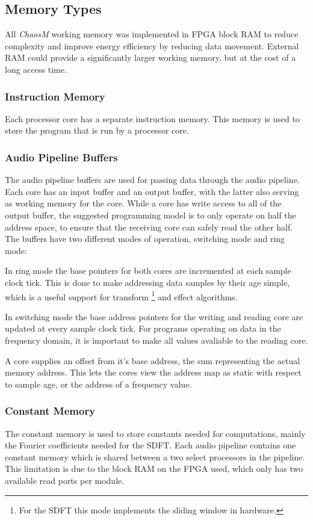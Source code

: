 
\subsection{Memory Types}\label{subsec:fpga-memory}

All \textit{ChaosM} working memory was implemented in FPGA block RAM to reduce complexity
and improve energy efficiency by reducing data movement. External RAM could
provide a significantly larger working memory, but at the cost of a long access time.

\subsubsection{Instruction Memory}
Each processor core has a separate instruction memory. This memory is used to
store the program that is run by a processor core.

\subsubsection{Audio Pipeline Buffers}
The audio pipeline buffers are used for passing data through the audio pipeline.
Each core has an input buffer and an output buffer, with the latter also serving
as working memory for the core. While a core has write access to all of the 
output buffer, the suggested programming model is to only operate on half the
address space, to ensure that the receiving core can safely read the other half.
The buffers have two different modes of operation, switching mode and ring mode:

In ring mode the base pointers for both cores are incremented at each sample
clock tick. This is done to make addressing data samples by their age simple,
which is a useful support for transform \footnote{For the SDFT this mode implements the sliding window in hardware.} and effect algorithms.

In switching mode the base address pointers for the writing and reading core are
updated at every sample clock tick. For programs operating on data in the
frequency domain, it is important to make all values avaliable to the reading core.

A core supplies an offset from it's base address, the sum representing the
actual memory address. This lets the cores view the address map as static with
respect to sample age, or the address of a frequency value.

\subsubsection{Constant Memory}
The constant memory is used to store constants needed for computations, mainly
the Fourier coefficients needed for the SDFT. Each audio pipeline contains one
constant memory which is shared between a two select processors in the
pipeline. This limitation is due to the block RAM on the FPGA used, which only 
has two available read ports per module.

